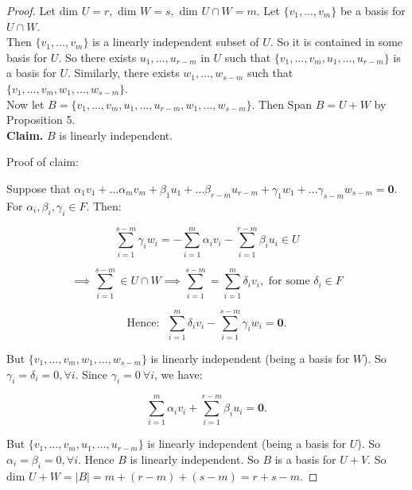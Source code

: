 \begin{proof}
Let dim $U = r, $ dim $W = s, $ dim $U \cap W = m$. Let $\{v_1, \dots, v_m\}$ be a basis for $U \cap W$.\\

Then $\{v_1,\dots,v_m\}$ is a linearly independent subset of $U$. So it is contained in some basis for $U$. So there exists $u_1,\dots, u_{r-m}$ in $U$ such that $\{v_1,\dots,v_m,u_1,\dots,u_{r-m}\}$ is a basis for $U$. Similarly, there exists $w_1,\dots,w_{s-m}$ such that $\{v_1,\dots,v_m,w_1,\dots,w_{s-m}\}$.\\


Now let $B = \{v_1,\dots,v_m,u_1,\dots,u_{r-m},w_1,\dots,w_{s-m}\}$. Then Span $B = U + W$ by Proposition 5.\\

\textbf{Claim.} $B$ is linearly independent.

Proof of claim:

Suppose that $\alpha_1v_1 + \dots \alpha_mv_m + \beta_1u_1 + \dots \beta_{r-m}u_{r-m} + \gamma_1w_1 + \dots \gamma_{s-m}w_{s-m} = \mathbf{0}.$ For $\alpha_i, \beta_i, \gamma_i \in F$. Then:

\[\sum_{i=1}^{s-m} \gamma_iw_i = -\sum_{i = 1}^{m} \alpha_iv_i - \sum_{i=1}^{r-m} \beta_iu_i \in U \]

\[\implies \sum_{i=1}^{s-m} \in U \cap W \implies \sum_{i=1}^{s-m} = \sum_{i=1}^{m} \delta_iv_i, \text{ for some } \delta_i \in F\]

\[\text{Hence:~ }\sum_{i=1}^{m} \delta_iv_i - \sum_{i=1}^{s-m} \gamma_iw_i = \mathbf{0}.\]

But $\{v_1,\dots,v_m,w_1,\dots,w_{s-m}\}$ is linearly independent (being a basis for $W$). So $\gamma_i =\delta_i = 0, \forall i$. Since $\gamma_i = 0 ~\forall i$, we have:

\[\sum_{i=1}^{m} \alpha_iv_i + \sum_{i=1}^{r-m} \beta_iu_i = \mathbf{0}.\]
 
 But $\{v_1,\dots,v_m,u_1,\dots,u_{r-m}\}$ is linearly independent (being a basis for $U$). So $\alpha_i =\beta_i = 0, \forall i$. Hence $B$ is linearly independent. So $B$ is a basis for $U+V$. So dim $U + W = |B| = m + (r-m) + (s-m) = r + s - m$.
\end{proof}\vspace*{10pt}
 
